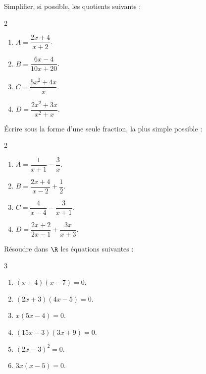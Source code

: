\exo

Simplifier, si possible, les quotients suivants :

\vspace{-6pt}
\setlength{\columnsep}{1cm}
\setlength{\columnseprule}{0pt}
\begin{multicols}{2}
\begin{enumerate}
\item $A=\dfrac{2x+4}{x+2}$.
\smallskip
\item $B=\dfrac{6x-4}{10x+20}$.

\item $C=\dfrac{5x^2+4x}{x}$.
\smallskip
\item $D=\dfrac{2x^2+3x}{x^2+x}$.
\end{enumerate}
\end{multicols}
\vspace{-12pt}

\exo

Écrire sous la forme d'une seule fraction, la plus simple possible :

\vspace{-6pt}
\setlength{\columnsep}{1cm}
\setlength{\columnseprule}{0pt}
\begin{multicols}{2}
\begin{enumerate}
\item $A=\dfrac{1}{x+1}-\dfrac{3}{x}$.
\smallskip
\item $B=\dfrac{2x+4}{x-2}+\dfrac{1}{2}$.

\item $C=\dfrac{4}{x-4}-\dfrac{3}{x+1}$.
\smallskip
\item $D=\dfrac{2x+2}{2x-1}+\dfrac{3x}{x+3}$.
\end{enumerate}
\end{multicols}
\vspace{-12pt}

\exo

Résoudre dans $\R$ les équations suivantes :

\vspace{-6pt}
\setlength{\columnsep}{1cm}
\setlength{\columnseprule}{0pt}
\begin{multicols}{3}
\begin{enumerate}
\item $(x+4)(x-7)=0$.
\smallskip
\item $(2x+3)(4x-5)=0$.

\item $x(5x-4)=0$.
\smallskip
\item $(15x-3)(3x+9)=0$.

\item $(2x-3)^2=0$.
\smallskip
\item $3x(x-5)=0$.
\end{enumerate}
\end{multicols}
\vspace{-12pt}

